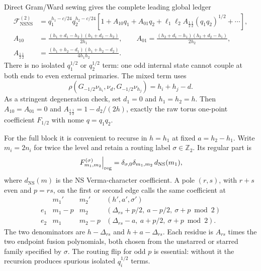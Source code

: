 \documentclass[11pt]{article}
\newcommand{\NS}{\mathrm{NS}}
\newcommand{\F}{\mathcal F}
\begin{document}
Direct Gram/Ward sewing gives the complete leading global ledger
\begin{equation}
\label{eq:torus-two-point-leading}
\begin{aligned}
 \F_{\NS\NS}^{(2)}
 &=q_1^{h_1-c/24}q_2^{h_2-c/24}
 \left[
 1+A_{10}q_1+A_{01}q_2
 +\ell_1\ell_2 A_{\frac12\frac12}(q_1q_2)^{1/2}
 +\cdots\right],
 \\
 A_{10}
 &=\frac{(h_1+d_1-h_2)(h_1+d_2-h_2)}{2h_1},
 \qquad
 A_{01}
 =\frac{(h_2+d_1-h_1)(h_2+d_2-h_1)}{2h_2},
 \\
 A_{\frac12\frac12}
 &=\frac{(h_1+h_2-d_1)(h_1+h_2-d_2)}
 {4h_1h_2}.
\end{aligned}
\end{equation}
There is no isolated $q_1^{1/2}$ or $q_2^{1/2}$ term: one odd internal
state cannot couple at both ends to even external primaries.  The mixed term
uses
\begin{equation}
 \rho(G_{-1/2}\nu_{h_i},\nu_d,G_{-1/2}\nu_{h_j})
 =h_i+h_j-d.
 \label{eq:torus-two-point-half-ward}
\end{equation}
As a stringent degeneration check, set $d_1=0$ and $h_1=h_2=h$.  Then
$A_{10}=A_{01}=0$ and
$A_{\frac12\frac12}=1-d_2/(2h)$, exactly the raw torus one-point
coefficient $F_{1/2}$ with nome $q=q_1q_2$.

For the full block it is convenient to recurse in $h=h_1$ at fixed
$a=h_2-h_1$.  Write $m_i=2n_i$ for twice the level and retain a routing
label $\sigma\in\mathbb Z_2$.  Its regular part is
\begin{equation}
 \left.F^{(\sigma)}_{m_1,m_2}\right|_{\rm reg}
 =\delta_{\sigma,0}\delta_{m_1,m_2}\,d_{\NS}(m_1),
 \label{eq:torus-two-point-h-seed}
\end{equation}
where $d_{\NS}(m)$ is the NS Verma-character coefficient.  A pole
$(r,s)$, with $r+s$ even and $p=rs$, on the first or second edge calls the
same coefficient at
\begin{equation}
\begin{array}{c|c|c|c}
 &m_1'&m_2'&(h',a',\sigma')\\ \hline
 e_1&m_1-p&m_2&
   (\Delta_{rs}+p/2,\ a-p/2,\ \sigma+p\bmod2)\\
 e_2&m_1&m_2-p&
   (\Delta_{rs}-a,\ a+p/2,\ \sigma+p\bmod2).
\end{array}
\label{eq:torus-two-point-h-shifts}
\end{equation}
The two denominators are $h-\Delta_{rs}$ and
$h+a-\Delta_{rs}$.  Each residue is $A_{rs}$ times the two endpoint
fusion polynomials, both chosen from the unstarred or starred family
specified by $\sigma$.  The routing flip for odd $p$ is essential:
without it the recursion produces spurious isolated $q_i^{1/2}$ terms.
\end{document}
